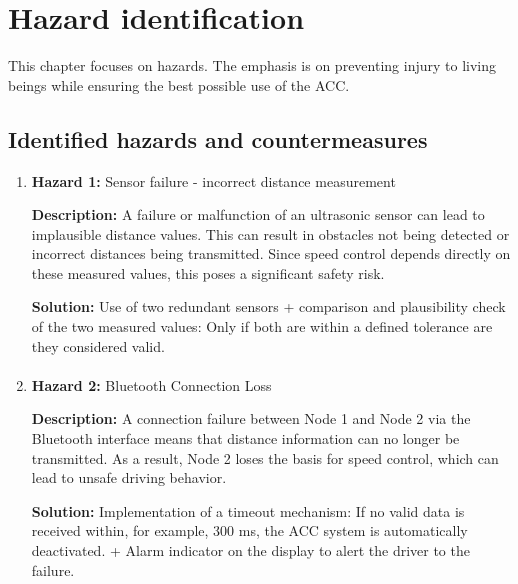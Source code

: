 \section{Hazard identification}
\label{chapter4}

This chapter focuses on hazards. The emphasis is on preventing injury to living beings while ensuring the best possible use of the ACC.

\subsection{Identified hazards and countermeasures}


	\begin{enumerate}
		\item \textbf{Hazard 1:} Sensor failure - incorrect distance measurement
            
            \textbf{Description:} A failure or malfunction of an ultrasonic sensor can lead to implausible distance values. This can result in obstacles not being detected or incorrect distances being transmitted. Since speed control depends directly on these measured values, this poses a significant safety risk.
            
            \textbf{Solution:} Use of two redundant sensors + comparison and plausibility check of the two measured values: Only if both are within a defined tolerance are they considered valid.

        \paragraph{}
		\item \textbf{Hazard 2:} Bluetooth Connection Loss
            
            \textbf{Description:} A connection failure between Node 1 and Node 2 via the Bluetooth interface means that distance information can no longer be transmitted. As a result, Node 2 loses the basis for speed control, which can lead to unsafe driving behavior.
            
            \textbf{Solution:} Implementation of a timeout mechanism: If no valid data is received within, for example, 300 ms, the ACC system is automatically deactivated. + Alarm indicator on the display to alert the driver to the failure.
        

\end{enumerate}
